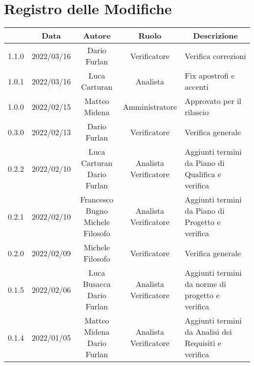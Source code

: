 \thispagestyle{empty}
\section*{Registro delle Modifiche}

\begin{center}
	\renewcommand{\arraystretch}{1.8}
	\begin{longtable}[c]{c | c | c | c | p{5cm}}
		\rowcolor[HTML]{125E28}
		\multicolumn{1}{c}{\color[HTML]{FFFFFF} \textbf{Versione}} & 
		\multicolumn{1}{c}{\color[HTML]{FFFFFF} \textbf{Data}} & 
		\multicolumn{1}{c}{\color[HTML]{FFFFFF} \textbf{Autore}} & 
		\multicolumn{1}{c}{\color[HTML]{FFFFFF} \textbf{Ruolo}} & 
		\multicolumn{1}{c}{\color[HTML]{FFFFFF} \textbf{Descrizione}} \\
		\endhead
		1.1.0 & 2022/03/16 & Dario Furlan & Verificatore & Verifica correzioni\\
		1.0.1 & 2022/03/16 & Luca Carturan & Analista & Fix apostrofi e accenti\\
		1.0.0 & 2022/02/15 & Matteo Midena & Amministratore & Approvato per il rilascio\\
		0.3.0 & 2022/02/13 & Dario Furlan & Verificatore & Verifica generale\\
		0.2.2 & 2022/02/10 & \Shortunderstack{Luca Carturan\\Dario Furlan} & \Shortunderstack{Analista\\Verificatore} & Aggiunti termini da Piano di Qualifica e verifica\\
		0.2.1 & 2022/02/10 & \Shortunderstack{Francesco Bugno\\Michele Filosofo} & \Shortunderstack{Analista\\Verificatore}	& Aggiunti termini da Piano di Progetto e verifica\\
		0.2.0 & 2022/02/09 & Michele Filosofo & Verificatore & Verifica generale\\
		0.1.5 & 2022/02/06 & \Shortunderstack{Luca Busacca\\Dario Furlan} & \Shortunderstack{Analista\\Verificatore} & Aggiunti termini da norme di progetto e verifica\\
		0.1.4 & 2022/01/05 & \Shortunderstack{Matteo Midena\\Dario Furlan} & \Shortunderstack{Analista\\Verificatore} & Aggiunti termini da Analisi dei Requisiti e verifica\\

\end{longtable}
\end{center}
